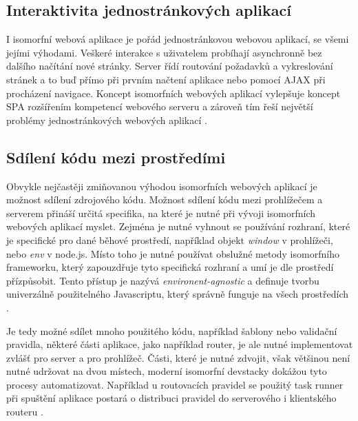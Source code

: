 \subsection{Interaktivita jednostránkových aplikací}
I isomorfní webová aplikace je pořád jednostránkovou webovou aplikací, se všemi jejími výhodami. Veškeré interakce s uživatelem probíhají asynchronně bez dalšího načítání nové stránky. Server řídí routování požadavků a vykreslování stránek a to buď přímo při prvním načtení aplikace nebo pomocí AJAX při procházení navigace. Koncept isomorfních webových aplikací vylepšuje koncept SPA rozšířením kompetencí webového serveru a zároveň tím řeší největší problémy jednostránkových webových aplikací \cite{isomorhic_book}.

\subsection{Sdílení kódu mezi prostředími}
Obvykle nejčastěji zmiňovanou výhodou isomorfních webových aplikací je možnost sdílení zdrojového kódu. Možnost sdílení kódu mezi prohlížečem a serverem přináší určitá specifika, na které je nutné při vývoji isomorfních webových aplikací myslet. Zejména je nutné vyhnout se používání rozhraní, které je specifické pro dané běhové prostředí, například objekt \textit{window} v prohlížeči, nebo \textit{env} v node.js. Místo toho je nutné používat obslužné metody isomorfního frameworku, který zapouzdřuje tyto specifická rozhraní a umí je dle prostředí přízpůsobit. Tento přístup je nazývá \textit{environent-agnostic} a definuje tvorbu univerzálně použitelného Javascriptu, který správně funguje na všech prostředích \cite{isomorhic_book} \cite{codepicnic_universaljs}.

Je tedy možné sdílet mnoho použitého kódu, například šablony nebo validační pravidla, některé části aplikace, jako například router, je ale nutné implementovat zvlášť pro server a pro prohlížeč. Části, které je nutné zdvojit, však většinou není nutné udržovat na dvou místech, moderní isomorfní devstacky dokážou tyto procesy automatizovat. Například u routovacích pravidel se použitý task runner při spuštění aplikace postará o distribuci pravidel do serverového i klientského routeru \cite{isomorhic_book} \cite{codepicnic_universaljs}.

